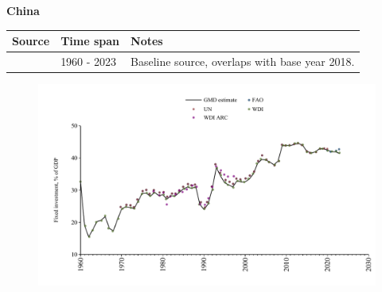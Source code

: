 \documentclass[12pt,a4paper,landscape]{article}
\begin{document}
\begin{adjustbox}{max totalsize={\paperwidth}{\paperheight},center}
\begin{minipage}[t][\textheight][t]{\textwidth}
\vspace*{0.5cm}
{}
\begin{center}
{\Large\bfseries China}
\end{center}
\vspace{0.5cm}
\begin{table}[H]
\centering
\small
\begin{tabular}{|l|l|l|}
\hline
\textbf{Source} & \textbf{Time span} & \textbf{Notes} \\
\hline
\rowcolor{white}\cite{WDI}& 1960 - 2023 &Baseline source, overlaps with base year 2018.\\
\hline
\end{tabular}
\end{table}
\begin{figure}[H]
\centering
\includegraphics[width=\textwidth,height=0.6\textheight,keepaspectratio]{graphs/CHN_finv_GDP.pdf}
\end{figure}
\end{minipage}
\end{adjustbox}
\end{document}
